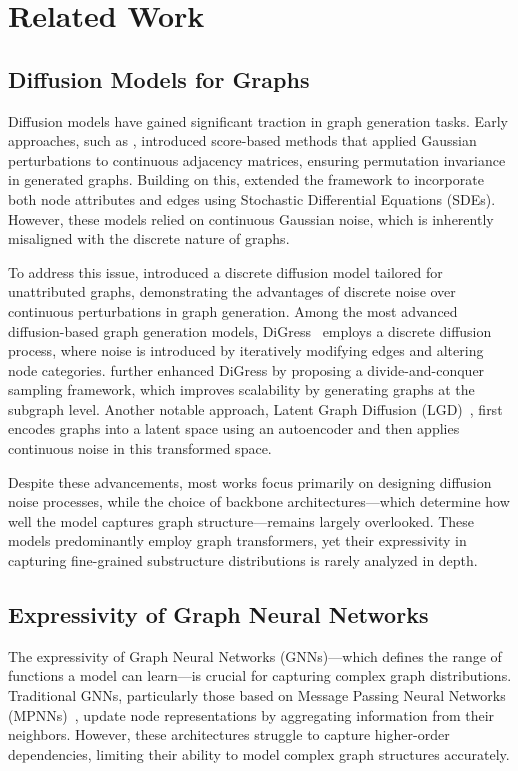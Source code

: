 \section{Related Work}
\subsection{Diffusion Models for Graphs}  
Diffusion models have gained significant traction in graph generation tasks. Early approaches, such as \citet{ScorebasedGraph}, introduced score-based methods that applied Gaussian perturbations to continuous adjacency matrices, ensuring permutation invariance in generated graphs. Building on this, \citet{ScorebasedGraphDSS} extended the framework to incorporate both node attributes and edges using Stochastic Differential Equations (SDEs). However, these models relied on continuous Gaussian noise, which is inherently misaligned with the discrete nature of graphs.  

To address this issue, \citet{DiffusionGraphBenefitDiscrete} introduced a discrete diffusion model tailored for unattributed graphs, demonstrating the advantages of discrete noise over continuous perturbations in graph generation. Among the most advanced diffusion-based graph generation models, DiGress~\citep{DiGressDDGraph} employs a discrete diffusion process, where noise is introduced by iteratively modifying edges and altering node categories. \citet{SaGessSamplingGraph} further enhanced DiGress by proposing a divide-and-conquer sampling framework, which improves scalability by generating graphs at the subgraph level. Another notable approach, Latent Graph Diffusion (LGD)~\citep{LGD}, first encodes graphs into a latent space using an autoencoder and then applies continuous noise in this transformed space.  

Despite these advancements, most works focus primarily on designing diffusion noise processes, while the choice of backbone architectures—which determine how well the model captures graph structure—remains largely overlooked. These models predominantly employ graph transformers, yet their expressivity in capturing fine-grained substructure distributions is rarely analyzed in depth.

\subsection{Expressivity of Graph Neural Networks}  
The expressivity of Graph Neural Networks (GNNs)—which defines the range of functions a model can learn—is crucial for capturing complex graph distributions. Traditional GNNs, particularly those based on Message Passing Neural Networks (MPNNs)~\citep{MPNN}, update node representations by aggregating information from their neighbors. However, these architectures struggle to capture higher-order dependencies, limiting their ability to model complex graph structures accurately.  

